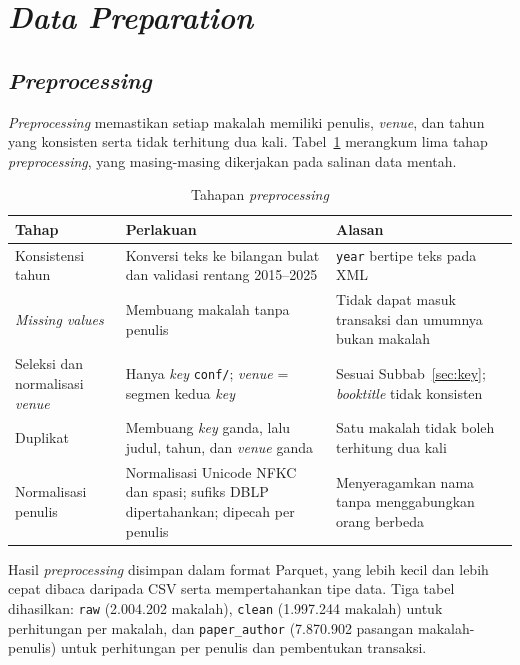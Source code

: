 \section{\textit{Data Preparation}}
\label{sec:preprocessing}
\subsection{\textit{Preprocessing}}
\textit{Preprocessing} memastikan setiap makalah memiliki penulis, \textit{venue}, dan tahun yang konsisten serta tidak terhitung dua kali. Tabel~\ref{tab:prepro} merangkum lima tahap \textit{preprocessing}, yang masing-masing dikerjakan pada salinan data mentah.

\begin{table}[!htb]
\caption{Tahapan \textit{preprocessing}}
\label{tab:prepro}
\small
\begin{tabularx}{\textwidth}{@{}p{3.3cm}XX@{}}
\toprule
\textbf{Tahap} & \textbf{Perlakuan} & \textbf{Alasan} \\
\midrule
Konsistensi tahun & Konversi teks ke bilangan bulat dan validasi rentang 2015--2025 & \texttt{year} bertipe teks pada XML \\
\midrule
\textit{Missing values} & Membuang makalah tanpa penulis & Tidak dapat masuk transaksi dan umumnya bukan makalah \\
\midrule
Seleksi dan normalisasi \textit{venue} & Hanya \textit{key} \texttt{conf/}; \textit{venue} = segmen kedua \textit{key} & Sesuai Subbab~\ref{sec:key}; \textit{booktitle} tidak konsisten \\
\midrule
Duplikat & Membuang \textit{key} ganda, lalu judul, tahun, dan \textit{venue} ganda & Satu makalah tidak boleh terhitung dua kali \\
\midrule
Normalisasi penulis & Normalisasi Unicode NFKC dan spasi; sufiks DBLP dipertahankan; dipecah per penulis & Menyeragamkan nama tanpa menggabungkan orang berbeda \\
\bottomrule
\end{tabularx}
\end{table}

Hasil \textit{preprocessing} disimpan dalam format Parquet, yang lebih kecil dan lebih cepat dibaca daripada CSV serta mempertahankan tipe data. Tiga tabel dihasilkan: \texttt{raw} (2.004.202 makalah), \texttt{clean} (1.997.244 makalah) untuk perhitungan per makalah, dan \texttt{paper\_author} (7.870.902 pasangan makalah-penulis) untuk perhitungan per penulis dan pembentukan transaksi.

